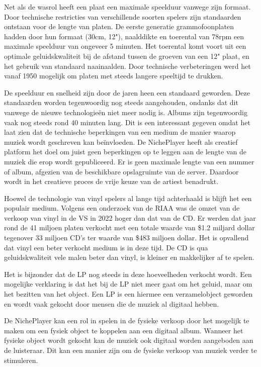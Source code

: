 Net als de wasrol heeft een plaat een maximale speelduur vanwege zijn formaat. Door technische restricties van verschillende soorten spelers zijn standaarden ontstaan voor de lengte van platen. De eerste generatie grammofoonplaten hadden door hun formaat (30cm, 12"), naalddikte en toerental van 78rpm een maximale speelduur van ongeveer 5 minuten. Het toerental komt voort uit een optimale geluidskwaliteit bij de afstand tussen de groeven van een 12" plaat, en het gebruik van standaard naainaalden. Door technische verbeteringen werd het vanaf 1950 mogelijk om platen met steeds langere speeltijd te drukken. 

De speelduur en snelheid zijn door de jaren heen een standaard geworden. Deze standaarden worden tegenwoordig nog steeds aangehouden, ondanks dat dit vanwege de nieuwe technologieën niet meer nodig is. Albums zijn tegenwoordig vaak nog steeds rond 40 minuten lang. Dit is een interessant gegeven omdat het laat zien dat de technische beperkingen van een medium de manier waarop muziek wordt geschreven kan beïnvloeden. De NichePlayer heeft als creatief platform het doel om juist geen beperkingen op te leggen aan de lengte van de muziek die erop wordt gepubliceerd. Er is geen maximale lengte van een nummer of album, afgezien van de beschikbare opslagruimte van de server. Daardoor wordt  in het creatieve proces de vrije keuze van de artiest benadrukt.

Hoewel de technologie van vinyl spelers al lange tijd achterhaald is blijft het een populair medium. Volgens een onderzoek van de RIAA \citep{year_end_2022_RIAA_revenue_statistics} was de omzet van de verkoop van vinyl in de VS in 2022 hoger dan dat van de CD. Er werden dat jaar rond de 41 miljoen platen verkocht met een totale waarde van \$1.2 miljard dollar tegenover 33 miljoen CD's ter waarde van \$483 miljoen dollar. Het is opvallend dat vinyl een beter verkocht medium is in deze tijd. De CD is qua geluidskwaliteit vele malen beter dan vinyl, is kleiner en makkelijker af te spelen.

Het is bijzonder dat de LP nog steeds in deze hoeveelheden verkocht wordt. Een mogelijke verklaring is dat het bij de LP niet meer gaat om het geluid, maar om het bezitten van het object. Een LP is een hiermee een verzamelobject geworden en wordt vaak gekocht door mensen die de muziek al digitaal hebben.

De NichePlayer kan een rol in spelen in de fysieke verkoop door het mogelijk te maken om een fysiek object te koppelen aan een digitaal album. Wanneer het fysieke object wordt gekocht kan de muziek ook digitaal worden aangeboden aan de luisteraar. Dit kan een manier zijn om de fysieke verkoop van muziek verder te stimuleren.

